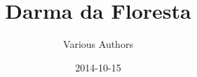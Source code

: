 \documentclass[
  final,
  pagePreset=largepage,
  babelLanguage=portuguese,
]{anecdote}
\title{Darma da Floresta}
\subtitle{}
\author{Various Authors}
\date{2014-10-15}
\begin{document}
\frontmatter

\cleartorecto
\tableofcontents

%
%
%
%
%

\mainmatter
\book{\thetitle}





%
%
%
%
%
%
%
%
%
%
%
%
%
%
%
%
%
%
%
%
%
%
%
%
%
%
%
%
%
%
%
%
%
%
%
%
%
%
%
%
\end{document}
